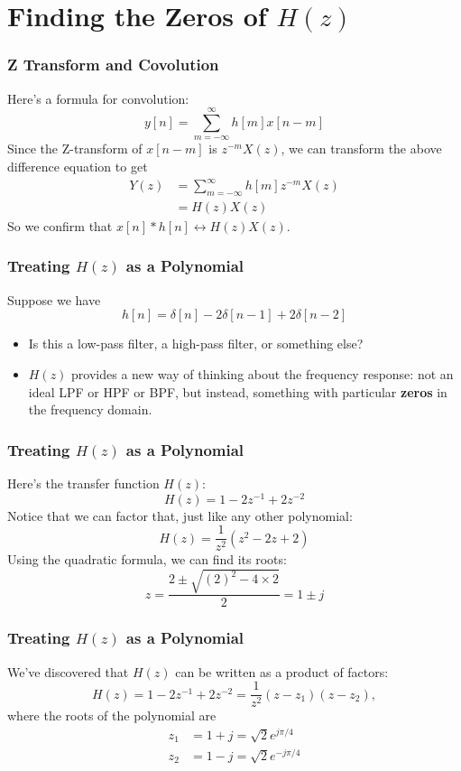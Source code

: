 \documentclass{beamer}
\begin{document}
\section[Zeros]{Finding the Zeros of $H(z)$}
\setcounter{subsection}{1}

\begin{frame}
  \frametitle{Z Transform and Covolution}
  
  Here's a formula for convolution:
  \[
  y[n] = \sum_{m=-\infty}^\infty h[m]x[n-m]
  \]
  Since the Z-transform of $x[n-m]$ is $z^{-m}X(z)$, we can transform
  the above difference equation to get
  \begin{align*}
  Y(z) &= \sum_{m=-\infty}^\infty h[m]z^{-m}X(z)\\
  &= H(z)X(z)
  \end{align*}
  So we confirm that $x[n]\ast h[n]\leftrightarrow H(z)X(z)$.
\end{frame}

\begin{frame}
  \frametitle{Treating $H(z)$ as a Polynomial}

  Suppose we have
  \[
  h[n] = \delta[n]-2\delta[n-1] + 2\delta[n-2]
  \]
  \begin{itemize}
  \item Is this a low-pass filter, a high-pass
    filter, or something else?
  \item $H(z)$ provides a new way of thinking about the frequency response:
    not an ideal LPF or HPF or BPF, but instead, something with
    particular {\bf zeros} in the frequency domain.
  \end{itemize}
\end{frame}

\begin{frame}
  \frametitle{Treating $H(z)$ as a Polynomial}
  
  Here's the transfer function $H(z)$:
  \[
  H(z) = 1-2z^{-1}+2z^{-2}
  \]
  Notice that we can factor that, just like any other polynomial:
  \[
  H(z) = \frac{1}{z^2}\left(z^2 -2z+2\right)
  \]
  Using the quadratic formula, we can find its roots:
  \[
  z = \frac{2\pm\sqrt{(2)^2-4\times 2}}{2}= 1\pm j
  \]
\end{frame}

\begin{frame}
  \frametitle{Treating $H(z)$ as a Polynomial}
  
  We've discovered that $H(z)$ can be written as a product of factors:
  \[
  H(z) = 1-2z^{-1}+2z^{-2} = \frac{1}{z^2}(z-z_1)(z-z_2),
  \]
  where the roots of the polynomial are
  \begin{align*}
    z_1 &= 1+j =\sqrt{2}e^{j\pi/4}\\
    z_2 &= 1-j = \sqrt{2}e^{-j\pi/4}
  \end{align*}
\end{frame}
\end{document}
